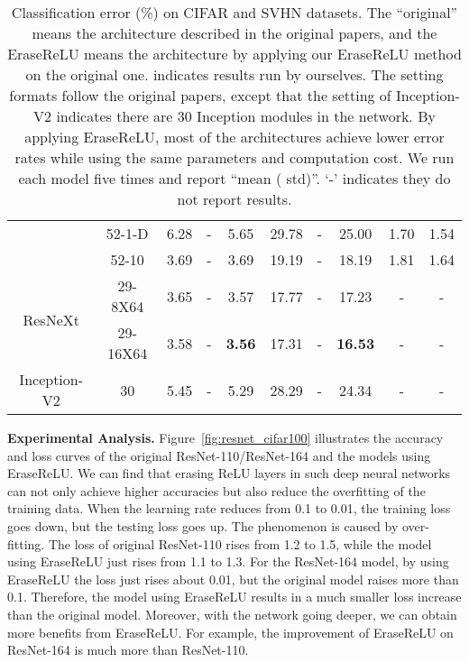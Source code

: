 \documentclass[10pt,twocolumn,letterpaper]{article}
\begin{document}
\begin{table*}[t]
\begin{center}
\begin{tabular}{|c|c|c|c|c|c|c|c|c|c|}
                                &52-1-D  &     6.28     &  -          &  5.65            &     29.78     &  -        &   25.00       & 1.70      & 1.54 \\
                                &52-10   & 3.69&  -          &  3.69            &19.19 &  -        &   18.19       & 1.81      & 1.64 \\\hline
\multirow{2}{*}{ResNeXt\cite{xie2017aggregated}}
								&29-8X64 &     3.65     &  -          &  3.57            &     17.77     &  -        &   17.23       &  -        &  -   \\
						        &29-16X64&     3.58     &  -          &\bf{3.56}         &     17.31     & -     &\bf{\color{blue}16.53}&  -    &  -   \\\hline
Inception-V2                    & 30     & 5.45&  -          &  5.29            & 28.29&  -        &   24.34       &  -        &  -   \\\hline
\end{tabular}
\end{center}
\caption{Classification error (\%) on CIFAR and SVHN datasets. The ``original'' means the architecture described in the original papers, and the EraseReLU means the architecture by applying our EraseReLU method on the original one.  indicates results run by ourselves. The setting formats follow the original papers, except that the setting of Inception-V2 indicates there are 30 Inception modules in the network. By applying EraseReLU, most of the architectures achieve lower error rates while using the same parameters and computation cost. We run each model five times and report ``mean ( std)''.
`-' indicates they do not report results.}
\label{table:cifar}
\end{table*}




{\bf Experimental Analysis.}
Figure~\ref{fig:resnet_cifar100} illustrates the accuracy and loss curves of the original ResNet-110/ResNet-164 and the models using EraseReLU.
We can find that erasing ReLU layers in such deep neural networks can not only achieve higher accuracies but also reduce the overfitting of the training data. When the learning rate reduces from 0.1 to 0.01, the training loss goes down, but the testing loss goes up. The phenomenon is caused by over-fitting. The loss of original ResNet-110 rises from 1.2 to 1.5, while the model using EraseReLU just rises from 1.1 to 1.3. For the ResNet-164 model, by using EraseReLU the loss just rises about 0.01, but the original model raises more than 0.1. Therefore, the model using EraseReLU results in a much smaller loss increase than the original model. Moreover, with the network going deeper, we can obtain more benefits from EraseReLU. For example, the improvement of EraseReLU on ResNet-164 is much more than ResNet-110.
\end{document}
